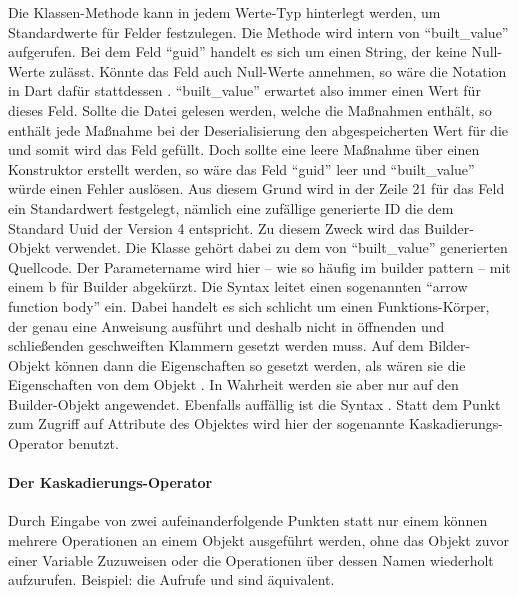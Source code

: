 Die Klassen-Methode  kann in jedem Werte-Typ hinterlegt werden, um Standardwerte für Felder festzulegen.
Die Methode wird intern von \enquote{built_value} aufgerufen. Bei dem Feld \enquote{guid} handelt es sich um einen String, der keine Null-Werte zulässt. Könnte das Feld auch Null-Werte annehmen, so wäre die Notation in Dart dafür stattdessen . \enquote{built_value} erwartet also immer einen Wert für dieses Feld. Sollte die Datei gelesen werden, welche die Maßnahmen enthält, so enthält jede Maßnahme bei der Deserialisierung den abgespeicherten Wert für die  und somit wird das Feld gefüllt. Doch sollte eine leere Maßnahme über einen Konstruktor erstellt werden, so wäre das Feld \enquote{guid} leer und \enquote{built_value} würde einen Fehler auslösen. Aus diesem Grund wird in der Zeile 21 für das Feld  ein Standardwert festgelegt, nämlich eine zufällige generierte ID die dem Standard Uuid der Version 4 entspricht.
Zu diesem Zweck wird das Builder-Objekt verwendet. Die Klasse  gehört dabei zu dem von \enquote{built_value} generierten Quellcode. Der Parametername wird hier – wie so häufig im builder pattern – mit einem b für Builder abgekürzt. Die Syntax \IC{=>} leitet  einen sogenannten \enquote{arrow function body} ein. Dabei handelt es sich schlicht um einen Funktions-Körper, der genau eine Anweisung ausführt und deshalb nicht in öffnenden und schließenden geschweiften Klammern gesetzt werden muss.
Auf dem Bilder-Objekt können dann die Eigenschaften so gesetzt werden, als wären sie die Eigenschaften von dem Objekt . In Wahrheit werden sie aber nur auf den Builder-Objekt angewendet.  Ebenfalls auffällig ist die Syntax .  Statt dem Punkt zum Zugriff auf Attribute des Objektes wird hier der sogenannte Kaskadierungs-Operator benutzt.

\paragraph{Der Kaskadierungs-Operator}

Durch Eingabe von zwei aufeinanderfolgende Punkten  statt nur einem  können mehrere Operationen an einem Objekt ausgeführt werden, ohne  das Objekt zuvor einer Variable Zuzuweisen oder die Operationen über dessen Namen wiederholt aufzurufen. Beispiel: die Aufrufe   und  sind äquivalent.

